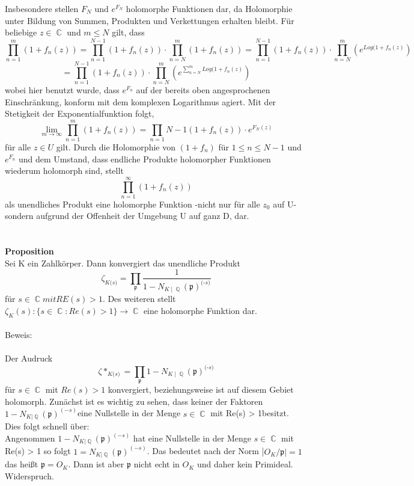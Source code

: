 \documentclass[10pt,a4paper]{article}
\DeclareMathOperator{\C}{\mathbb{C}}
\DeclareMathOperator{\Q}{\mathbb{Q}}
\begin{document}
Insbesondere stellen $F_{N}$ und $e^{F_{N}}$ holomorphe Funktionen dar, da Holomorphie unter Bildung von Summen, Produkten und Verkettungen erhalten bleibt. Für beliebige $z \in \C $ und $m\leq N$ gilt, dass $$\prod_{n = 1 }^{m}( 1 + f_{n}(z)) = \prod_{n = 1}^{N - 1}( 1 + f_{n}(z))\cdot\prod_{n = N}^{m}( 1 + f_{n}(z))= \prod_{n = 1}^{N - 1}( 1 + f_{n}(z))\cdot\prod_{n = N}^{m}(e^{Log( 1 + f_{n}(z)}) $$ $$= \prod_{n = 1}^{N - 1}( 1 + f_{n}(z))\cdot\prod_{n = N}^{m}(e^{\sum_{n = N}^{m}Log( 1 + f_{n}(z)})$$wobei hier benutzt wurde, dass $e^{F_{n}}$ auf der bereits oben angesprochenen Einschränkung, konform mit dem komplexen Logarithmus agiert. Mit der Stetigkeit der Exponentialfunktion folgt,$$\lim_{m\rightarrow\infty}\prod_{n=1}^m ( 1 + f_{n}(z)) =\prod_{n = 1}{N - 1}(1 + f_{n}(z))\cdot e^{F_{N}(z)}$$ für alle $z \in U$ gilt. Durch die Holomorphie von $(1+ f_{n})$ für $1 \leq n \leq N - 1$ und $e^{F_{n}}$ und dem Umstand, dass endliche Produkte holomorpher Funktionen wiederum holomorph sind, stellt $$\prod_{n =1}^{\infty}(1 +f_n (z))$$ als unendliches Produkt eine holomorphe Funktion -nicht nur für alle $z_0$ auf U- sondern aufgrund der Offenheit der Umgebung U auf ganz D, dar.
\\
\\
\\
\textbf{Proposition}
\\
Sei K ein Zahlkörper. Dann konvergiert das unendliche Produkt $$\zeta_{\textit{K} \textit{(s)}}= \prod_{\mathfrak{p}}\frac{1}{1- N_{\textit{K}\mid\Q}(\mathfrak{p})^\textit{(-s)}}$$ für $s \in \C mit RE(s) > 1$. Des weiteren stellt $\zeta_{K}(s)\colon \{ s \in \C \colon Re(s)>1\} \rightarrow \C$ eine holomorphe Funktion dar.
\\
\\
Beweis:
\\
\\
Der Audruck
$$\zeta*_{\textit{K} \textit{(s)}}= \prod_{\mathfrak{p}}1- N_{\textit{K}\mid\Q}(\mathfrak{p})^\textit{(-s)}$$ für $s \in \C$ mit $Re(s) > 1$ konvergiert, beziehungsweise ist auf diesem Gebiet holomorph.
Zunächst ist es wichtig zu sehen, dass keiner der Faktoren $ 1- N_{K|\Q}(\mathfrak{p})^{(-s)}$eine Nullstelle in der Menge $s \in \C$ mit Re(s) > 1besitzt.
\\
Dies folgt schnell über: 
\\
Angenommen $1- N_{K|\Q}(\mathfrak{p})^{(-s)}$ hat eine Nullstelle in der Menge  $s \in \C $ mit Re(s) > 1 so folgt $1 = N_{K|\Q}(\mathfrak{p})^{(-s)}$. Das bedeutet nach der Norm |$O_K /\mathfrak{p}| = 1$ das heißt $\mathfrak{p} = O_K$. Dann ist aber $\mathfrak{p}$ nicht echt in $O_K$ und daher kein Primideal. Widerspruch.
\end{document}
